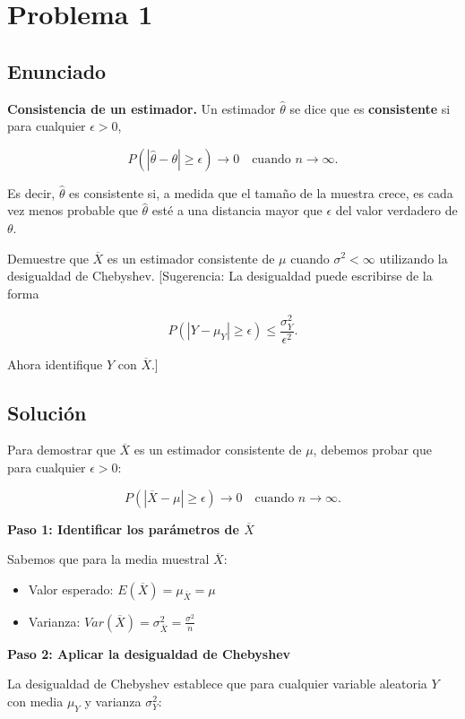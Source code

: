 \documentclass[12pt]{article}
\begin{document}
\section{Problema 1}
\subsection{Enunciado}

\textbf{Consistencia de un estimador.} Un estimador $\hat{\theta}$ se dice que es \textbf{consistente} si para cualquier $\epsilon > 0$,

$$P(|\hat{\theta} - \theta| \geq \epsilon) \to 0 \quad \text{cuando } n \to \infty.$$

Es decir, $\hat{\theta}$ es consistente si, a medida que el tamaño de la muestra crece, es cada vez menos probable que $\hat{\theta}$ esté a una distancia mayor que $\epsilon$ del valor verdadero de $\theta$.

Demuestre que $\overline{X}$ es un estimador consistente de $\mu$ cuando $\sigma^2 < \infty$ utilizando la desigualdad de Chebyshev. [Sugerencia: La desigualdad puede escribirse de la forma

$$P(|Y - \mu_Y| \geq \epsilon) \leq \frac{\sigma_Y^2}{\epsilon^2}.$$

Ahora identifique $Y$ con $\overline{X}$.]

\subsection{Solución}

Para demostrar que $\overline{X}$ es un estimador consistente de $\mu$, debemos probar que para cualquier $\epsilon > 0$:

$$P(|\overline{X} - \mu| \geq \epsilon) \to 0 \quad \text{cuando } n \to \infty.$$

\textbf{Paso 1: Identificar los parámetros de $\overline{X}$}

Sabemos que para la media muestral $\overline{X}$:
\begin{itemize}
    \item Valor esperado: $E(\overline{X}) = \mu_{\overline{X}} = \mu$
    \item Varianza: $Var(\overline{X}) = \sigma^2_{\overline{X}} = \frac{\sigma^2}{n}$
\end{itemize}

\textbf{Paso 2: Aplicar la desigualdad de Chebyshev}

La desigualdad de Chebyshev establece que para cualquier variable aleatoria $Y$ con media $\mu_Y$ y varianza $\sigma^2_Y$:
\end{document}
